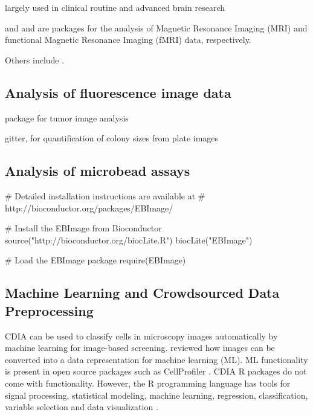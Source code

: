 largely used in clinical routine and advanced brain research

 \citep{bordier_temporal_2011, marchini_analyzefmri:_2002} and  
\citep{polzehl_fmri:_2007} and are packages for the analysis of Magnetic 
Resonance Imaging (MRI) and functional Magnetic Resonance Imaging (fMRI) data, 
respectively.

 \citep{philipsen_pet:_2010}

Others include  \citep{dunning_beadarray:_2006, frery_introduction_2013}.

\subsection{Analysis of fluorescence image data}

 package \citep{failmezger_crimage:_2012} for tumor image analysis


gitter, for quantification of colony sizes from plate images \citep{wagih_gitter:_2014}


\subsection{Analysis of microbead assays}

\citep{rodiger_highly_2013, rodiger_nucleic_2014}

\begin{example}
# Detailed installation instructions are available at 
# http://bioconductor.org/packages/EBImage/

# Install the EBImage from Bioconductor
source("http://bioconductor.org/biocLite.R")
biocLite("EBImage")

# Load the EBImage package
require(EBImage)


\end{example}

\subsection{Machine Learning and Crowdsourced Data Preprocessing}
CDIA can be used to classify cells in microscopy images automatically by machine 
learning for image-based screening. \citet{sommer_machine_2013} reviewed how 
images can be converted into a data representation for machine learning (ML). ML 
functionality is present in open source packages such as CellProfiler 
\citep{conrad_micropilot:_2011, sommer_machine_2013}. CDIA R packages do not 
come with functionality. However, the R programming language has tools for 
signal processing, statistical modeling, machine learning, regression, 
classification, variable selection and data visualization 
\citep{abbas_comparative_2014, fuchs_clustering_2010, pau_ebimager_2010, 
genuer-poggi-tuleaumalot:2015}.

